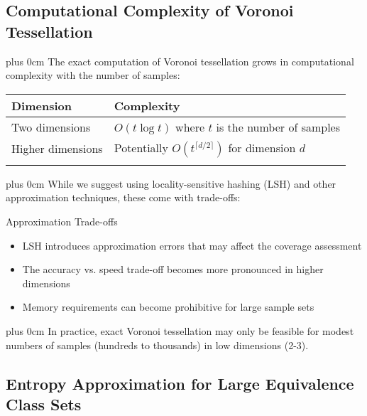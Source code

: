 \documentclass[11pt,a4paper]{article}
\newcommand{\justifytext}{\leftskip=0pt \rightskip=0pt plus 0cm}
\newcommand{\tabletitlecolor}{blue!70!black}
\newcommand{\tableheader}[1]{\cellcolor{tablerow1}\textbf{\large #1}}
\begin{document}
\subsection{Computational Complexity of Voronoi Tessellation}

\justifytext
The exact computation of Voronoi tessellation grows in computational complexity with the number of samples:

\begin{tcolorbox}[
  enhanced,
  colback=white,
  colframe=\tabletitlecolor,
  arc=0mm,
  boxrule=0.5pt,
  left=0pt,
  right=0pt,
  top=2pt,
  bottom=2pt,
  boxsep=0pt,
  width=\textwidth
]
\vspace{1mm}
\begin{tabularx}{\textwidth}{>{\raggedright\arraybackslash}X|>{\raggedright\arraybackslash}X}
\tableheader{Dimension} & \tableheader{Complexity} \\
\hline
\addlinespace[3pt]
Two dimensions & $O(t \log t)$ where $t$ is the number of samples \\
\addlinespace[3pt]
\hline
\addlinespace[3pt]

Higher dimensions & Potentially $O(t^{\lceil d/2 \rceil})$ for dimension $d$ \\
\addlinespace[3pt]
\end{tabularx}
\vspace{1mm}
\end{tcolorbox}

\justifytext
While we suggest using locality-sensitive hashing (LSH) and other approximation techniques, these come with trade-offs:

\begin{alertbox}{Approximation Trade-offs}
\begin{itemize}
\item LSH introduces approximation errors that may affect the coverage assessment
\item The accuracy vs. speed trade-off becomes more pronounced in higher dimensions
\item Memory requirements can become prohibitive for large sample sets
\end{itemize}
\end{alertbox}

\justifytext
In practice, exact Voronoi tessellation may only be feasible for modest numbers of samples (hundreds to thousands) in low dimensions (2-3).

\subsection{Entropy Approximation for Large Equivalence Class Sets}
\end{document}
